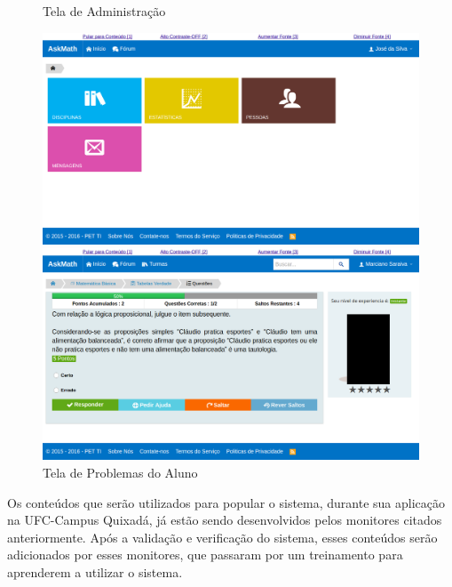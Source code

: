 \begin{figure}[H]
  \begin{minipage}[b]{0.49\textwidth}
    \caption{Tela de Administra\c{c}\~ao}
    \includegraphics[width=\textwidth]{figuras/askmath/3}
  \end{minipage}
  \hfill
  \begin{minipage}[b]{0.49\textwidth}
	\caption{Tela de Problemas do Aluno}
    \includegraphics[width=\textwidth]{figuras/askmath/4}
  \end{minipage}
\end{figure}

Os conteúdos que serão utilizados para popular o sistema, durante sua aplicação na UFC-Campus Quixadá, já estão sendo desenvolvidos pelos monitores citados anteriormente. Após a validação e verificação do sistema, esses conteúdos serão adicionados por esses monitores, que passaram por um treinamento para aprenderem a utilizar o sistema.







